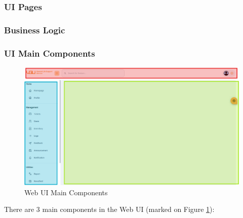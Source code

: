	
	\subsubsection{UI Pages}
	\subsubsection{Business Logic}
	

	\subsubsection{UI Main Components}
	\begin{figure}[H]
		\centering
		\includegraphics[width=1\linewidth]{graphics/fe/fe-main-comp}
		\caption{Web UI Main Components}
		\label{fig:fe-main-comp}
	\end{figure}
	There are 3 main components in the Web UI (marked on Figure \ref{fig:fe-main-comp}):
	
